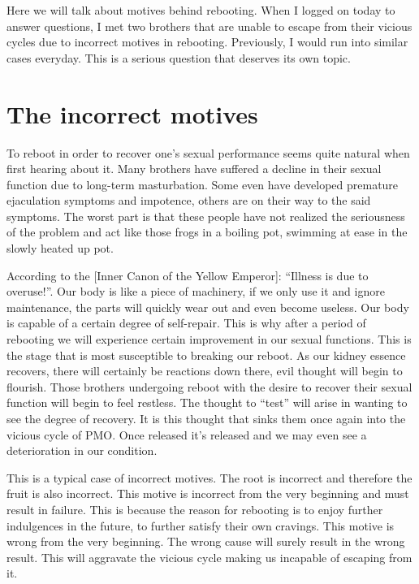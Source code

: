 \documentclass[
]{book}
\begin{document}
Here we will talk about motives behind rebooting. When I logged on today to answer questions, I met two brothers that are unable to escape from their vicious cycles due to incorrect motives in rebooting. Previously, I would run into similar cases everyday. This is a serious question that deserves its own topic.

\hypertarget{the-incorrect-motives}{%
\section{The incorrect motives}\label{the-incorrect-motives}}

To reboot in order to recover one's sexual performance seems quite natural when first hearing about it. Many brothers have suffered a decline in their sexual function due to long-term masturbation. Some even have developed premature ejaculation symptoms and impotence, others are on their way to the said symptoms. The worst part is that these people have not realized the seriousness of the problem and act like those frogs in a boiling pot, swimming at ease in the slowly heated up pot.

According to the {[}Inner Canon of the Yellow Emperor{]}: ``Illness is due to overuse!''. Our body is like a piece of machinery, if we only use it and ignore maintenance, the parts will quickly wear out and even become useless. Our body is capable of a certain degree of self-repair. This is why after a period of rebooting we will experience certain improvement in our sexual functions. This is the stage that is most susceptible to breaking our reboot. As our kidney essence recovers, there will certainly be reactions down there, evil thought will begin to flourish. Those brothers undergoing reboot with the desire to recover their sexual function will begin to feel restless. The thought to ``test'' will arise in wanting to see the degree of recovery. It is this thought that sinks them once again into the vicious cycle of PMO. Once released it's released and we may even see a deterioration in our condition.

This is a typical case of incorrect motives. The root is incorrect and therefore the fruit is also incorrect. This motive is incorrect from the very beginning and must result in failure. This is because the reason for rebooting is to enjoy further indulgences in the future, to further satisfy their own cravings. This motive is wrong from the very beginning. The wrong cause will surely result in the wrong result. This will aggravate the vicious cycle making us incapable of escaping from it.
\end{document}
